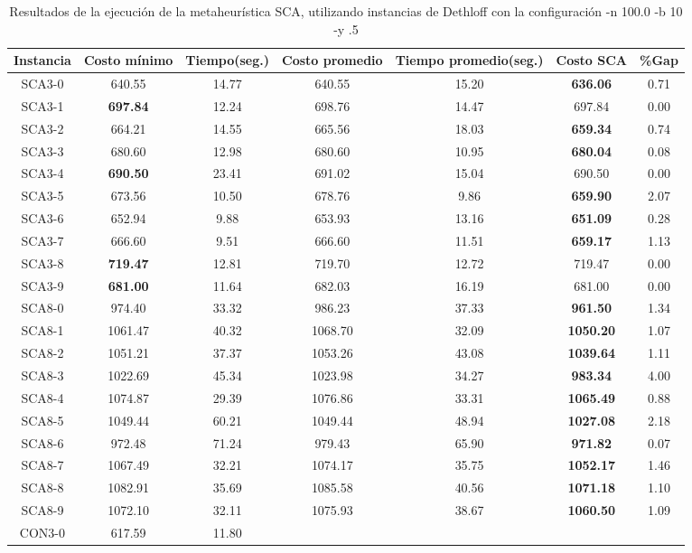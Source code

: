 \begin{table}[ht]
\caption{Resultados de la ejecución de la metaheurística SCA, utilizando instancias de Dethloff con la configuración -n 100.0 -b 10 -y .5}
\centering
\small
\begin{tabular}{c c c c c c c}
\hline\hline
Instancia & Costo mínimo & Tiempo(seg.) & Costo promedio & Tiempo promedio(seg.) & Costo SCA & \%Gap \\ [0.5ex]
\hline
SCA3-0 & 640.55 & 14.77 & 
640.55 & 15.20 & \bf{636.06} & 
0.71\\SCA3-1 & \bf{697.84} & 12.24 & 
698.76 & 14.47 & 697.84 & 0.00\\
SCA3-2 & 664.21 & 14.55 & 
665.56 & 18.03 & \bf{659.34} & 
0.74\\SCA3-3 & 680.60 & 12.98 & 
680.60 & 10.95 & \bf{680.04} & 
0.08\\SCA3-4 & \bf{690.50} & 23.41 & 
691.02 & 15.04 & 690.50 & 0.00\\
SCA3-5 & 673.56 & 10.50 & 
678.76 & 9.86 & \bf{659.90} & 
2.07\\SCA3-6 & 652.94 & 9.88 & 
653.93 & 13.16 & \bf{651.09} & 
0.28\\SCA3-7 & 666.60 & 9.51 & 
666.60 & 11.51 & \bf{659.17} & 
1.13\\SCA3-8 & \bf{719.47} & 12.81 & 
719.70 & 12.72 & 719.47 & 0.00\\
SCA3-9 & \bf{681.00} & 11.64 & 
682.03 & 16.19 & 681.00 & 0.00\\
SCA8-0 & 974.40 & 33.32 & 
986.23 & 37.33 & \bf{961.50} & 
1.34\\SCA8-1 & 1061.47 & 40.32 & 
1068.70 & 32.09 & \bf{1050.20} & 
1.07\\SCA8-2 & 1051.21 & 37.37 & 
1053.26 & 43.08 & \bf{1039.64} & 
1.11\\SCA8-3 & 1022.69 & 45.34 & 
1023.98 & 34.27 & \bf{983.34} & 
4.00\\SCA8-4 & 1074.87 & 29.39 & 
1076.86 & 33.31 & \bf{1065.49} & 
0.88\\SCA8-5 & 1049.44 & 60.21 & 
1049.44 & 48.94 & \bf{1027.08} & 
2.18\\SCA8-6 & 972.48 & 71.24 & 
979.43 & 65.90 & \bf{971.82} & 
0.07\\SCA8-7 & 1067.49 & 32.21 & 
1074.17 & 35.75 & \bf{1052.17} & 
1.46\\SCA8-8 & 1082.91 & 35.69 & 
1085.58 & 40.56 & \bf{1071.18} & 
1.10\\SCA8-9 & 1072.10 & 32.11 & 
1075.93 & 38.67 & \bf{1060.50} & 
1.09\\CON3-0 & 617.59 & 11.80 & 

\end{tabular}
\end{table}

